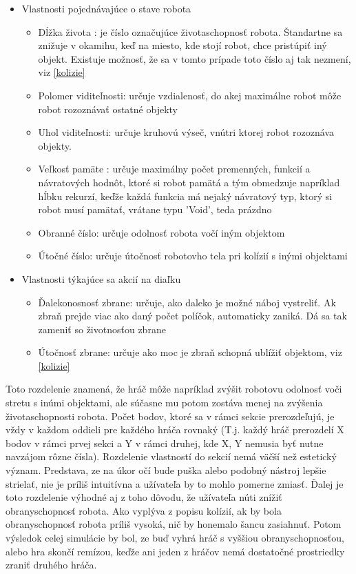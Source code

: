 \begin{itemize}
\item Vlastnosti pojednávajúce o stave robota
\begin{itemize} 
\item Dĺžka života : je číslo označujúce životaschopnosť robota. Štandartne sa znižuje v okamihu, keď na miesto, kde stojí robot, chce pristúpiť iný objekt. Existuje možnosť, že sa v tomto prípade toto číslo aj tak nezmení, viz \ref{kolizie} 
\item Polomer viditeľnosti: určuje vzdialenosť, do akej maximálne robot môže robot rozoznávať ostatné objekty
\item Uhol viditeľnosti: určuje kruhovú výseč, vnútri ktorej robot rozoznáva objekty.
\item Veľkosť pamäte : určuje maximálny počet premenných, funkcií a návratových hodnôt, ktoré si robot pamätá a tým obmedzuje napríklad hĺbku rekurzí, keďže každá funkcia má nejaký návratový typ, ktorý si robot musí pamätať, vrátane typu 'Void', teda prázdno
\item Obranné číslo: určuje odolnosť robota vočí iným objektom
\item Útočné číslo: určuje útočnosť robotovho tela pri kolízií s inými objektami
\end{itemize}
\item Vlastnosti týkajúce sa akcií na diaľku
\begin{itemize}
\item Ďalekonosnosť zbrane: určuje, ako daleko je možné náboj vystreliť. Ak zbraň prejde viac ako daný počet políčok, automaticky zaniká. Dá sa tak zameniť so životnosťou zbrane
\item Útočnosť zbrane: určuje ako moc je zbraň schopná ublížiť objektom, viz \ref{kolizie}
\end{itemize}
\end{itemize}
Toto rozdelenie znamená, že hráč môže napríklad zvýšit robotovu odolnosť voči stretu s inúmi objektami, ale súčasne mu potom zostáva menej na zvýšenia životaschopnosti robota. Počet bodov, ktoré sa v rámci sekcie prerozdeľujú, je vždy v každom oddieli pre každého hráča rovnaký (T.j. každý hráč prerozdelí X bodov v rámci prvej sekci a  Y v rámci druhej, kde X, Y nemusia byť nutne navzájom rôzne čísla). Rozdelenie vlastností do sekcií nemá väčší než estetický význam. Predstava, ze na úkor očí bude puška alebo podobný nástroj lepšie strielať, nie je príliš intuitívna a užívateľa by to mohlo pomerne zmiasť. Ďalej je toto rozdelenie výhodné aj z toho dôvodu, že užívateľa núti znížiť obranyschopnosť robota. Ako vyplýva z popisu kolízií, ak by bola obranyschopnosť robota príliš vysoká, nič by honemalo šancu zasiahnuť. Potom výsledok celej simulácie by bol, ze buď vyhrá hráč s vyššiou obranyschopnosťou, alebo hra skončí remízou, keďže ani jeden z hráčov nemá dostatočné prostriedky zraniť druhého hráča. \\
